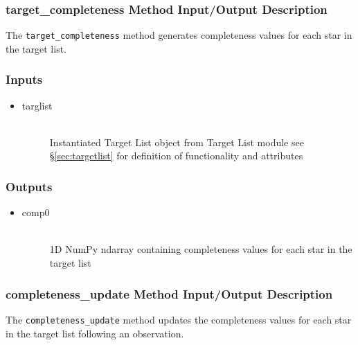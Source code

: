 \documentclass[cleanfoot]{asme2ej}
\begin{document}
\subsubsection{target\_completeness Method Input/Output Description}
\label{sec:targetcompletenesstask}
The \verb+target_completeness+ method generates completeness values for each star in the target list.

\subsubsection*{Inputs}
\begin{itemize}
    \item 
    \begin{description}
        \item[targlist] \hfill \\
        Instantiated Target List object from Target List module see \S\ref{sec:targetlist} for definition of functionality and attributes
    \end{description}
\end{itemize}

\subsubsection*{Outputs}
\begin{itemize}
    \item 
    \begin{description}
        \item[comp0] \hfill \\
        1D NumPy ndarray containing completeness values for each star in the target list
    \end{description}
\end{itemize}

\subsubsection{completeness\_update Method Input/Output Description}
\label{sec:completenessupdatetask}
The \verb+completeness_update+ method updates the completeness values for each star in the target list following an observation.
\end{document}

